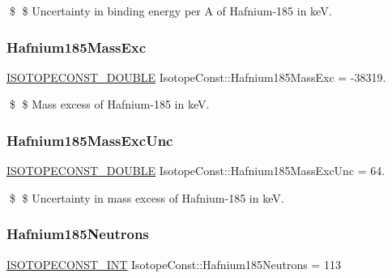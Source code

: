 \$ \$ Uncertainty in binding energy per A of Hafnium-\/185 in keV. \mbox{\label{group___isotope_const-_hafnium-_hf185_gacd5eb6bf2c83c050183e9d1e4325cf31}} 
\subsubsection{\texorpdfstring{Hafnium185\+Mass\+Exc}{Hafnium185MassExc}}
{\footnotesize\ttfamily \mbox{\hyperlink{group___isotope_const-_macros_ga8f45a7272ce02c0b4c65c44636ed719a}{I\+S\+O\+T\+O\+P\+E\+C\+O\+N\+S\+T\+\_\+\+D\+O\+U\+B\+LE}} Isotope\+Const\+::\+Hafnium185\+Mass\+Exc = -\/38319.}

\$ \$ Mass excess of Hafnium-\/185 in keV. \mbox{\label{group___isotope_const-_hafnium-_hf185_ga6865e23b572f473022e56107528b1a13}} 
\subsubsection{\texorpdfstring{Hafnium185\+Mass\+Exc\+Unc}{Hafnium185MassExcUnc}}
{\footnotesize\ttfamily \mbox{\hyperlink{group___isotope_const-_macros_ga8f45a7272ce02c0b4c65c44636ed719a}{I\+S\+O\+T\+O\+P\+E\+C\+O\+N\+S\+T\+\_\+\+D\+O\+U\+B\+LE}} Isotope\+Const\+::\+Hafnium185\+Mass\+Exc\+Unc = 64.}

\$ \$ Uncertainty in mass excess of Hafnium-\/185 in keV. \mbox{\label{group___isotope_const-_hafnium-_hf185_ga17926f1174b77939bb4e60e9013d98db}} 
\subsubsection{\texorpdfstring{Hafnium185\+Neutrons}{Hafnium185Neutrons}}
{\footnotesize\ttfamily \mbox{\hyperlink{group___isotope_const-_macros_ga5f18360b3e99483a35c32d789e62621c}{I\+S\+O\+T\+O\+P\+E\+C\+O\+N\+S\+T\+\_\+\+I\+NT}} Isotope\+Const\+::\+Hafnium185\+Neutrons = 113}

